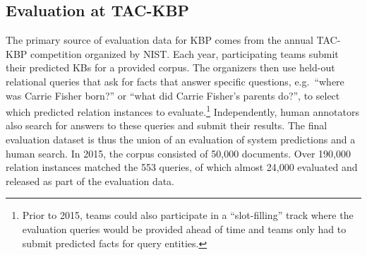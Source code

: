 \subsection{Evaluation at TAC-KBP}

The primary source of evaluation data for KBP comes from the annual TAC-KBP competition organized by NIST.\@ %
Each year, participating teams submit their predicted KBs for a provided corpus.
The organizers then use held-out relational queries that ask for facts that answer specific questions, e.g.\ ``where was Carrie Fisher born?'' or ``what did Carrie Fisher's parents do?'', to select which predicted relation instances to evaluate.\footnote{%
  Prior to 2015, teams could also participate in a ``slot-filling'' track where the evaluation queries would be provided ahead of time and teams only had to submit predicted facts for query entities.}
Independently, human annotators also search for answers to these queries and submit their results.
The final evaluation dataset is thus the union of an evaluation of system predictions and a human search.
In 2015, the corpus consisted of 50,000 documents.
Over 190,000 relation instances matched the 553 queries, of which almost 24,000 evaluated and released as part of the evaluation data.
